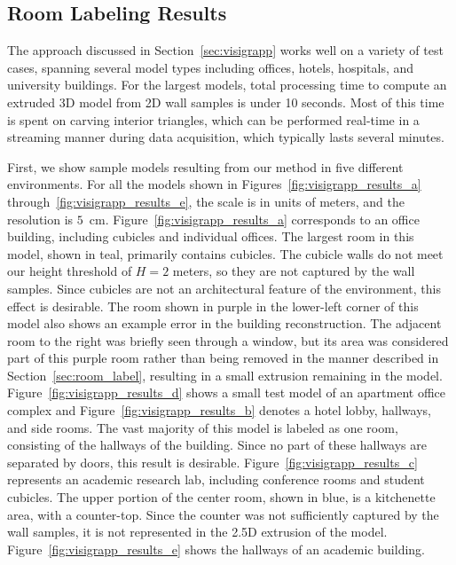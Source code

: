 \documentclass[12pt,onecolumn,oneside]{book}
\begin{document}
\subsection{Room Labeling Results}
\label{ssec:visigrapp_results}

The approach discussed in Section~\ref{sec:visigrapp} works well on a variety of test cases, spanning several model types including offices, hotels, hospitals, and university buildings.  For the largest models, total processing time to compute an extruded 3D model from 2D wall samples is under 10 seconds.  Most of this time is spent on carving interior triangles, which can be performed real-time in a streaming manner during data acquisition, which typically lasts several minutes.

First, we show sample models resulting from our method in five different environments.  For all the models shown in Figures~\ref{fig:visigrapp_results_a} through~\ref{fig:visigrapp_results_e}, the scale is in units of meters, and the resolution is $5$~cm.  Figure~\ref{fig:visigrapp_results_a} corresponds to an office building, including cubicles and individual offices.  The largest room in this model, shown in teal, primarily contains cubicles.  The cubicle walls do not meet our height threshold of $H=2$ meters, so they are not captured by the wall samples.  Since cubicles are not an architectural feature of the environment, this effect is desirable.  The room shown in purple in the lower-left corner of this model also shows an example error in the building reconstruction.  The adjacent room to the right was briefly seen through a window, but its area was considered part of this purple room rather than being removed in the manner described in Section~\ref{sec:room_label}, resulting in a small extrusion remaining in the model.
Figure~\ref{fig:visigrapp_results_d} shows a small test model of an apartment office complex and Figure~\ref{fig:visigrapp_results_b} denotes a hotel lobby, hallways, and side rooms.  The vast majority of this model is labeled as one room, consisting of the hallways of the building.  Since no part of these hallways are separated by doors, this result is desirable.  Figure~\ref{fig:visigrapp_results_c} represents an academic research lab, including conference rooms and student cubicles.  The upper portion of the center room, shown in blue, is a kitchenette area, with a counter-top.  Since the counter was not sufficiently captured by the wall samples, it is not represented in the 2.5D extrusion of the model. Figure~\ref{fig:visigrapp_results_e} shows the hallways of an academic building.
\end{document}
